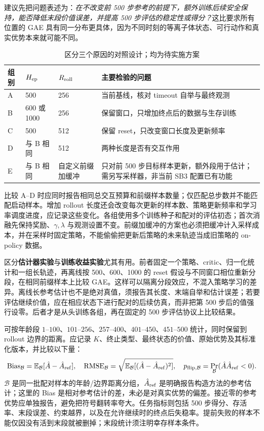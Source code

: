 \documentclass[12pt,fontset=none]{ctexart}
\numberwithin{equation}{section}
\numberwithin{table}{section}
\numberwithin{figure}{section}
\begin{document}
建议先把问题表述为：\emph{在不改变前 500 步参考的前提下，额外训练后续安全保持，能否降低末段价值误差，并提高 500 步评估的稳定性或得分？}这比要求所有位置的 GAE 具有同一分布更具体，因为不同时刻的等离子体状态、可行动作和真实优势本来就可能不同。

\begin{table}[!ht]
\centering\small
\caption{区分三个原因的对照设计；均为待实施方案}\label{tab:gaet-design}
\begin{tabular}{L{1.4cm}L{2.6cm}L{2.4cm}L{6.4cm}}
\toprule
组别 & $H_{\rm ep}$ & $R_{\rm roll}$ & 主要检验的问题 \\
\midrule
A & 500 & 256 & 当前基线，核对 timeout 自举与最终观测 \\
B & 600 或 1000 & 256 & 保留窗口，只增加终点后的数据与生存训练 \\
C & 500 & 512 & 保留 reset，只改变窗口长度及更新频率 \\
D & 与 B 相同 & 512 & 两种长度是否有交互作用 \\
E & 与 B 相同 & 自定义前缀加缓冲 & 只对前 500 步目标样本更新，额外段用于估计；需另写采样器，非当前 SB3 配置已有功能 \\
\bottomrule
\end{tabular}
\end{table}

比较 A--D 时应同时报告相同总交互预算和前缀样本数量；仅匹配总步数并不能匹配启动样本。增加 rollout 长度还会改变每次更新的样本数、策略更新频率和学习率调度进度，应记录这些变化。各组使用多个训练种子和配对的评估初态；首次消融先保持奖励、$\gamma,\lambda$ 与观测设置不变。前缀加缓冲的方案也必须把缓冲计入采样成本，并在采样时固定策略，不能偷偷把更新后策略的未来轨迹当成旧策略的 on-policy 数据。

区分\textbf{估计器实验}与\textbf{训练收益实验}尤其有用。前者固定一个策略、critic、归一化统计和一组长轨迹，再离线按 500、600、1000 的 reset 假设与不同窗口相位重新分段，在相同前缀样本上比较 GAE。这样可以隔离分段效应，不混入策略学习的差异。离线长参考估计也不是绝对真值，须报告其长度、末端自举和估计误差；若要评估继续价值，应在相应状态下进行配对的后续仿真，而非把第 500 步后的值强行设零。后者才是从头训练各组，再在固定的 500 步评估协议上比较结果。

可按年龄段 $1$--$100$、$101$--$256$、$257$--$400$、$401$--$450$、$451$--$500$ 统计，同时保留到 rollout 边界的距离。应记录 $K$、终止类型、最终状态的价值、原始优势及其标准化版本，并比较以下量：
\begin{equation}\label{eq:gaet-diagnostics}
 \operatorname{Bias}_{\mathcal B}=\mathbb E_{\mathcal B}[\hat A-\hat A_{\rm ref}],\quad
 \operatorname{RMSE}_{\mathcal B}=\sqrt{\mathbb E_{\mathcal B}[(\hat A-\hat A_{\rm ref})^2]},\quad
 p_{\rm flip,\mathcal B}=\Pr_{\mathcal B}(\hat A\hat A_{\rm ref}<0).
\end{equation}
$\mathcal B$ 是同一批配对样本的年龄/边界距离分组，$\hat A_{\rm ref}$ 是明确报告构造方法的参考估计；这里的 Bias 是相对参考估计的差，未必是对真实优势的偏差。接近零的参考优势应单独报告，避免把符号翻转率夸大。任务指标则包括 500 步得分、存活率、末段误差、约束越界，以及在允许继续时的终点后失稳率。提前失败的样本不能仅因没有活到末段就被删掉；末段统计须注明幸存样本条件。
\end{document}
